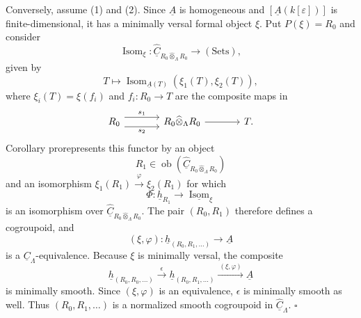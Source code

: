 Conversely, assume (1) and (2). Since $\underline A$ is homogeneous
and $[\underline A(k[\varepsilon])]$ is finite-dimensional, it has a
minimally versal formal object $\xi$. Put $P(\xi)=R_0$ and consider
\[
 \operatorname{Isom}_\xi:
 \widehat{\underline C}_{R_0\widehat\otimes_\Lambda R_0}
 \longrightarrow(\mathrm{Sets}),
\]
given by
\[
 T\longmapsto
 \operatorname{Isom}_{\underline A(T)}(\xi_1(T),\xi_2(T)),
\]
where $\xi_i(T)=\xi(f_i)$ and $f_i:R_0\longrightarrow T$ are the
composite maps in
\[
\begin{tikzcd}[column sep=large]
 R_0 \arrow[r,shift left=2,"s_1"]
     \arrow[r,shift right=2,"s_2"']
 & R_0\widehat\otimes_\Lambda R_0 \arrow[r] & T.
\end{tikzcd}
\]
Corollary  prorepresents this functor by an object
\[
 R_1\in
 \operatorname{ob}(\widehat{\underline C}_{R_0\widehat\otimes_\Lambda R_0})
\]
and an isomorphism
$\xi_1(R_1)\xrightarrow{\varphi}\xi_2(R_1)$ for which
\[
 \Phi:\underline h_{R_1}\longrightarrow
 \underline{\operatorname{Isom}}_\xi
\]
is an isomorphism over
$\widehat{\underline C}_{R_0\widehat\otimes_\Lambda R_0}$. The pair
$(R_0,R_1)$ therefore defines a cogroupoid, and
\[
 (\xi,\varphi):\underline h_{(R_0,R_1,\ldots)}
 \longrightarrow\underline A
\]
is a $\underline C_\Lambda$-equivalence. Because $\xi$ is minimally
versal, the composite
\[
 \underline h_{(R_0,R_0,\ldots)}
 \xrightarrow{\ \epsilon\ }
 \underline h_{(R_0,R_1,\ldots)}
 \xrightarrow{\ (\xi,\varphi)\ }
 \underline A
\]
is minimally smooth. Since $(\xi,\varphi)$ is an equivalence,
$\epsilon$ is minimally smooth as well. Thus
$(R_0,R_1,\ldots)$ is a normalized smooth cogroupoid in
$\widehat{\underline C}_\Lambda$. \hfill$\square$
